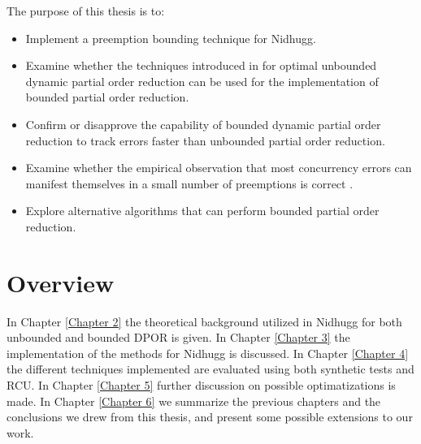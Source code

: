 The purpose of this thesis is to: 
\begin{itemize}
   \item Implement a preemption bounding technique \cite{BPOR} for Nidhugg. 
   \item Examine whether the techniques introduced in \cite{AbdullaAronisJohnssonSagonasDPOR2014} for optimal unbounded dynamic partial order reduction can
   be used for the implementation of bounded partial order reduction.
   \item Confirm or disapprove the capability of bounded dynamic partial order reduction to track errors faster than unbounded partial order reduction.
   \item Examine whether the empirical observation that most concurrency errors can manifest themselves in a small number of preemptions is correct \cite{Musu07}.
   \item Explore alternative algorithms that can perform bounded partial order reduction.
\end{itemize}

\iffalse
The purpose of this thesis is the implementation of a preemption bounding technique \cite{BPOR} for Nidhugg and the combination
of this technique with the a novel technique \cite{AbdullaAronisJohnssonSagonasDPOR2014} suggested for better coverage of the state space.
The bounded-DPOR was used to verify the linux kernel \cite{LinuxKernel} and specifically RCU \cite{Spin}. RCU is a synchronization
mechanism used heavily in Linux kernel, and many of the kernel’s subsystems rely on RCU’s correct operation. By using BPOR the minimum preemptive
switches required to track failure injections were counted. As a result the empirical observation that errors occur in a small bound count was confirmed.
Moreover, the possible application of various optimizations used for unbounded DPOR on bounded DPOR are examined. 
\fi

\section{Overview}
In Chapter \ref{Chapter 2} the theoretical background utilized in Nidhugg for both unbounded and bounded DPOR is given.
In Chapter \ref{Chapter 3} the implementation of the methods for Nidhugg is discussed. In Chapter \ref{Chapter 4} the different techniques
implemented are evaluated using both synthetic tests and RCU. In Chapter \ref{Chapter 5} further discussion on possible optimatizations
is made. In Chapter \ref{Chapter 6} we summarize the previous chapters and the conclusions
we drew from this thesis, and present some possible extensions to our work.
